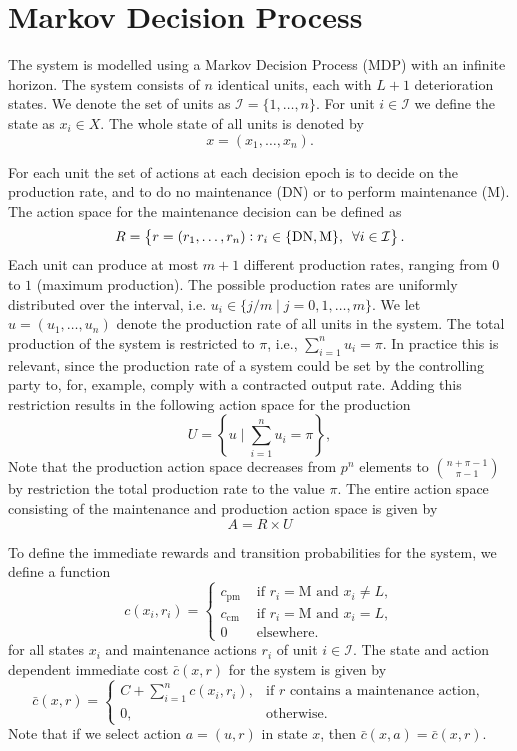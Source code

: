 \documentclass[a4paper,11pt]{article}
\begin{document}
\section{Markov Decision Process}

The system is modelled using a Markov Decision Process (MDP) with an infinite horizon. The system consists of $n$ identical units, each with $L+1$ deterioration states. We denote the set of units as $\mathcal{I} = \{1, \dots, n\}$. For unit $i \in \mathcal{I}$ we define the state as $x_i \in X$. The whole state of all units is denoted by
$$
x = (x_1, \dots, x_n).
$$

For each unit the set of actions at each decision epoch is to decide on the production rate, and to do no maintenance (DN) or to perform maintenance (M). The action space for the maintenance decision can be defined as
$$
R = \left \{r = (r_1, \dots, r_n): r_i \in \{\text{DN}, \text{M}\}, \enskip \forall i \in \mathcal{I} \right \}.
$$
Each unit can produce at most $m+1$ different production rates, ranging from $0$ to $1$ (maximum production). The possible production rates are uniformly distributed over the interval, i.e. $u_i \in \{j / m \mid j = 0, 1, \dots, m\}$. We let $u = (u_1, \dots, u_n)$ denote the production rate of all units in the system. The total production of the system is restricted to $\pi$, i.e., $ \sum_{i=1}^{n}u_i = \pi$. In practice this is relevant, since the production rate of a system could be set by the controlling party to, for, example, comply with a contracted output rate. Adding this restriction results in the following action space for the production
$$
U = \left\{ u \mid  \sum_{i=1}^{n}u_i = \pi \right\},
$$
Note that the production action space decreases from $p^n$ elements to ${n + \pi - 1} \choose{\pi - 1} $ by restriction the total production rate to the value $\pi$.  The entire action space consisting of the maintenance and production action space is given by
$$
A = R \times U 
$$

To define the immediate rewards and transition probabilities for the system, we define a function
$$
c(x_i,r_i) = \begin{cases}
c_{\text{pm}} & \text{ if } r_i = \text{M} \text{ and } x_i \neq L, \\
c_{\text{cm}} & \text{ if } r_i = \text{M} \text{ and } x_i = L, \\
0 & \text{ elsewhere}.
\end{cases}
$$
for all states $x_i$ and maintenance actions $r_i$ of unit $i \in \mathcal{I}$.  The state and action dependent immediate cost $\bar{c}(x,r)$ for the system is given by
$$
\bar{c}(x,r) = \begin{cases}
C + \sum_{i=1}^{n}c(x_i, r_i), &\text{if } r \text{ contains a maintenance action},\\
0, &\text{otherwise}.
\end{cases}
$$
Note that if we select action $a = (u, r)$ in state $x$, then $\bar{c}(x, a) = \bar{c}(x,r)$.
\end{document}
